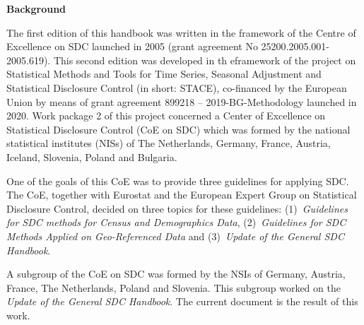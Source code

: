 	
	\vfill %
	
	\newpage 

	

		
	\noindent \textbf{\large Background}\bigskip

	\justifying

	\noindent The first edition of this handbook was written in the framework of the Centre of Excellence on SDC launched in 2005 (grant agreement No 25200.2005.001-2005.619).
 	 This second edition was developed in th eframework of the project on Statistical Methods and Tools
	 for Time Series, Seasonal Adjustment and Statistical Disclosure Control (in short: STACE), 
	 co-financed by the European Union by means of grant agreement 899218 -- 2019-BG-Methodology launched in 2020. 
	 Work package 2 of this project concerned a Center of Excellence on Statistical Disclosure Control (CoE on SDC)
	  which was formed by the national statistical institutes (NISs) of The Netherlands, Germany, France, Austria, 
	  Iceland, Slovenia, Poland and Bulgaria.

	One of the goals of this CoE was to provide three guidelines for applying SDC. 
	The CoE, together with Eurostat and the European Expert Group on Statistical Disclosure Control, 
	decided on three topics for these guidelines: (1)~\textit{Guidelines for SDC methods for Census and Demographics Data},
	 (2)~\textit{Guidelines for SDC Methods Applied on Geo-Referenced Data} and (3)~\textit{Update of the General SDC Handbook}.

	A subgroup of the CoE on SDC was formed by the NSIs of Germany, Austria, France, The Netherlands, Poland and Slovenia. 
	This subgroup worked on the \textit{Update of the General SDC Handbook}. The current document is the result of this work.

	\vfill

